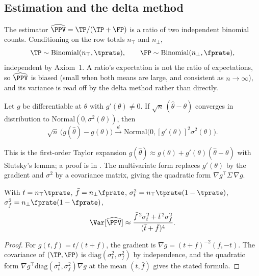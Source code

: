 \subsection*{Estimation and the delta method}

The estimator $\widehat{\PPV} = \TP/(\TP + \FP)$ is a ratio of two independent
binomial counts. Conditioning on the row totals $n_\top$ and $n_\bot$,
\[
  \TP \sim \mathrm{Binomial}(n_\top, \tprate),
  \qquad
  \FP \sim \mathrm{Binomial}(n_\bot, \fprate),
\]
independent by Axiom~1. A ratio's expectation is not the ratio of
expectations, so $\widehat{\PPV}$ is biased (small when both means are large,
and consistent as $n \to \infty$), and its variance is read off by the delta
method rather than directly.

\begin{theorem}
\label{thm:delta-method}
Let $g$ be differentiable at $\theta$ with $g'(\theta)
\neq 0$. If $\sqrt{n}\,(\hat\theta - \theta)$ converges in distribution to
$\mathrm{Normal}(0, \sigma^2(\theta))$, then
\[
  \sqrt{n}\,\bigl(g(\hat\theta) - g(\theta)\bigr) \xrightarrow{d}
  \mathrm{Normal}\bigl(0, [g'(\theta)]^2\sigma^2(\theta)\bigr).
\]
\end{theorem}

\noindent This is the first-order Taylor expansion $g(\hat\theta) \approx
g(\theta) + g'(\theta)(\hat\theta - \theta)$ with Slutsky's lemma; a proof is
in \textcite[Ch.~5]{casella-berger}. The multivariate form replaces
$g'(\theta)$ by the gradient and $\sigma^2$ by a covariance matrix, giving the
quadratic form $\nabla g^\top \Sigma\, \nabla g$.

\begin{proposition}
\label{prop:ppv-variance}
With $\bar t = n_\top\tprate$, $\bar f = n_\bot\fprate$, $\sigma_t^2 =
n_\top\tprate(1 - \tprate)$, $\sigma_f^2 = n_\bot\fprate(1 - \fprate)$,
\[
  \Var[\widehat{\PPV}] \approx
  \frac{\bar f^{\,2}\sigma_t^2 + \bar t^{\,2}\sigma_f^2}{(\bar t + \bar f)^4}.
\]
\end{proposition}

\begin{proof}
For $g(t, f) = t/(t + f)$, the gradient is $\nabla g = (t + f)^{-2}(f, -t)$.
The covariance of $(\TP, \FP)$ is $\mathrm{diag}(\sigma_t^2, \sigma_f^2)$ by
independence, and the quadratic form $\nabla g^\top \mathrm{diag}(\sigma_t^2,
\sigma_f^2)\nabla g$ at the mean $(\bar t, \bar f)$ gives the stated formula.
\end{proof}

